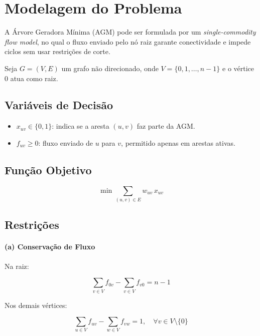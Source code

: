\section{Modelagem do Problema}%
\label{sec:modelagem}

A Árvore Geradora Mínima (AGM) pode ser formulada por um \textit{single-commodity flow model}, no qual o fluxo enviado pelo nó raiz garante conectividade e impede ciclos sem usar restrições de corte.

Seja $G = (V,E)$ um grafo não direcionado, onde $V = \{0,1,\ldots,n-1\}$ e o vértice $0$ atua como raiz.

\subsection{Variáveis de Decisão}

\begin{itemize}
    \item $x_{uv} \in \{0,1\}$: indica se a aresta $(u,v)$ faz parte da AGM.\@
    \item $f_{uv} \ge 0$: fluxo enviado de $u$ para $v$, permitido apenas em arestas ativas.
\end{itemize}

\subsection{Função Objetivo}

\begin{equation}
    \min \sum_{(u,v)\in E} w_{uv}\, x_{uv}
\end{equation}

\subsection{Restrições}

\paragraph{(a) Conservação de Fluxo}

Na raiz:

\begin{equation}
    \sum_{v \in V} f_{0v} - \sum_{v \in V} f_{v0} = n-1
\end{equation}

Nos demais vértices:

\begin{equation}
    \sum_{u \in V} f_{u v} - \sum_{w \in V} f_{v w} = 1,
    \quad \forall v \in V \setminus \{0\}
\end{equation}

